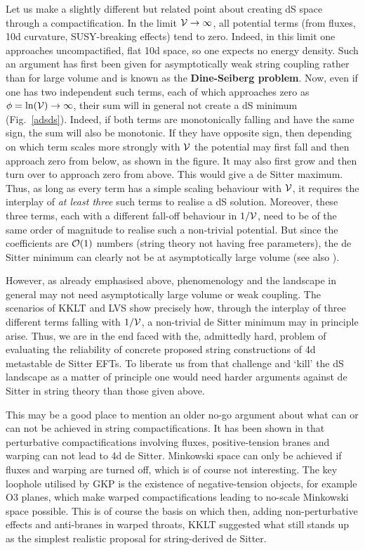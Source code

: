 \documentclass[12pt]{article}
\numberwithin{equation}{section}
\begin{document}
Let us make a slightly different but related point about creating dS space through a compactification. In the limit ${\cal V}\to \infty$, all potential terms (from fluxes, 10d curvature, SUSY-breaking effects) tend to zero. Indeed, in this limit one approaches uncompactified, flat 10d space, so one expects no energy density. Such an argument has first been given for asymptotically weak string coupling rather than for large volume \cite{Dine:1985he} and is known as the {\bf Dine-Seiberg problem}. Now, even if one has two independent such terms, each of which approaches zero as $\phi=\ln({\cal V})\to \infty$, their sum will in general not create a dS minimum (Fig.~\ref{adsds}). Indeed, if both terms are monotonically falling and have the same sign, the sum will also be monotonic. If they have opposite sign, then depending on which term scales more strongly with ${\cal V}$ the potential may first fall and then approach zero from below, as shown in the figure. It may also first grow and then turn over to approach zero from above. This would give a de Sitter maximum. Thus, as long as every term has a simple scaling behaviour with ${\cal V}$, it requires the interplay of {\it at least three} such terms to realise a dS solution. Moreover, these three terms, each with a different fall-off behaviour in $1/{\cal V}$, need to be of the same order of magnitude to realise such a non-trivial potential. But since the coefficients are ${\cal O}(1)$ numbers (string theory not having free parameters), the de Sitter minimum can clearly not be at asymptotically large volume (see also \cite{Ooguri:2018wrx}).

However, as already emphasised above, phenomenology and the landscape in general may not need asymptotically large volume or weak coupling. The scenarios of KKLT \cite{Kachru:2003aw} and LVS \cite{Balasubramanian:2005zx} show precisely how, through the interplay of three different terms falling with $1/{\cal V}$, a non-trivial de Sitter minimum may in principle arise. Thus, we are in the end faced with the, admittedly hard, problem of evaluating the reliability of concrete proposed string constructions of 4d metastable de Sitter EFTs. To liberate us from that challenge and `kill' the dS landscape as a matter of principle one would need harder arguments against de Sitter in string theory than those given above.

This may be a good place to mention an older no-go argument about what can or can not be achieved in string compactifications. It has been shown in \cite{Maldacena:2000mw} that perturbative compactifications involving fluxes, positive-tension branes and warping can not lead to 4d de Sitter. Minkowski space can only be achieved if fluxes and warping are turned off, which is of course not interesting. The key loophole utilised by GKP \cite{Giddings:2001yu} is the existence of negative-tension objects, for example O3 planes, which make warped compactifications leading to no-scale Minkowski space possible. This is of course the basis on which then, adding non-perturbative effects and anti-branes in warped throats, KKLT suggested what still stands up as the simplest realistic proposal for string-derived de Sitter.
\end{document}
